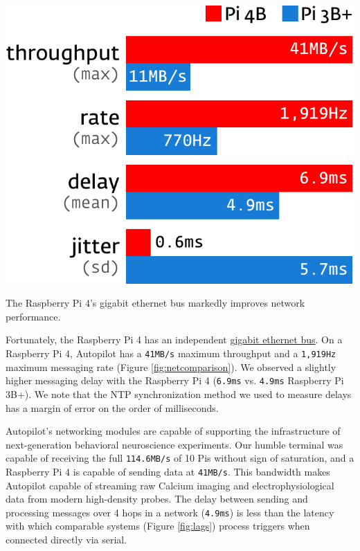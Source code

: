 \documentclass[nohyper, justified, notitlepage, marginals=raggedright,twoside=false,debug]{tufte-autopilot}
\begin{document}
\begin{marginfigure}[0.1cm]
\includegraphics[]{figures/test_4_comparison.pdf}
\caption{The Raspberry Pi 4's gigabit ethernet bus markedly improves network performance.}
\label{fig:netcomparison}
\end{marginfigure}

Fortunately, the Raspberry Pi 4 has an independent \href{https://www.raspberrypi.org/magpi/raspberry-pi-4-specs-benchmarks/}{gigabit ethernet bus}. On a Raspberry Pi 4, Autopilot has a \texttt{41MB/s} maximum throughput and a \texttt{1,919Hz} maximum messaging rate (Figure \ref{fig:netcomparison}). We observed a slightly higher messaging delay with the Raspberry Pi 4 (\texttt{6.9ms} vs. \texttt{4.9ms} Raspberry Pi 3B+). We note that the NTP synchronization method we used to measure delays has a margin of error on the order of milliseconds. 

Autopilot's networking modules are capable of supporting the infrastructure of next-generation behavioral neuroscience experiments. Our humble terminal was capable of receiving the full \texttt{114.6MB/s} of 10 Pis without sign of saturation, and a Raspberry Pi 4 is capable of sending data at \texttt{41MB/s}. This bandwidth makes Autopilot capable of streaming raw Calcium imaging and electrophysiological data from modern high-density probes. The delay between sending and processing messages over 4 hops in a network (\texttt{4.9ms}) is less than the latency with which comparable systems (Figure \ref{fig:lags}) process triggers when connected directly via serial.
\end{document}
